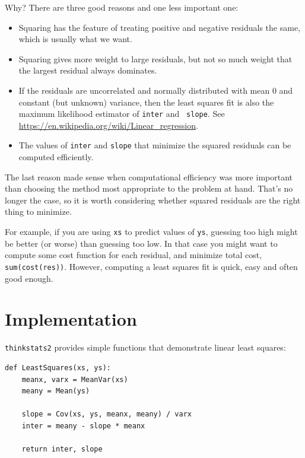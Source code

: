 \documentclass[12pt]{book}
\theoremstyle{exercise}
\begin{document}
Why?  There are three good reasons and one less important one:

\begin{itemize}

\item Squaring has the feature of treating positive and
negative residuals the same, which is usually what we want.

\item Squaring gives more weight to large residuals, but not
so much weight that the largest residual always dominates.

\item If the residuals are uncorrelated and normally distributed with
  mean 0 and constant (but unknown) variance, then the least squares
  fit is also the maximum likelihood estimator of {\tt inter} and {\tt
    slope}.  See
  \url{https://en.wikipedia.org/wiki/Linear_regression}.%
%
%

\item The values of {\tt inter} and {\tt slope} that minimize
  the squared residuals can be computed efficiently.

\end{itemize}

The last reason made sense when computational efficiency was more
important than choosing the method most appropriate to the problem
at hand.  That's no longer the case, so it is worth considering
whether squared residuals are the right thing to minimize.%
%

For example, if you are using {\tt xs} to predict values of {\tt ys},
guessing too high might be better (or worse) than guessing too low.
In that case you might want to compute some cost function for each
residual, and minimize total cost, {\tt sum(cost(res))}.
However, computing a least squares fit is quick, easy and often good
enough.%


\section{Implementation}

{\tt thinkstats2} provides simple functions that demonstrate
linear least squares:%

\begin{verbatim}
def LeastSquares(xs, ys):
    meanx, varx = MeanVar(xs)
    meany = Mean(ys)

    slope = Cov(xs, ys, meanx, meany) / varx
    inter = meany - slope * meanx

    return inter, slope
\end{verbatim}
\end{document}
